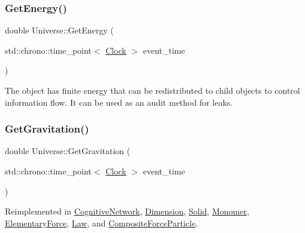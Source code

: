 \mbox{\label{classUniverse_a3b25e7ce6552991b7d5e6a9eb6e8a7ff}} 
\subsubsection{\texorpdfstring{Get\+Energy()}{GetEnergy()}}
{\footnotesize\ttfamily double Universe\+::\+Get\+Energy (\begin{DoxyParamCaption}\item[{std\+::chrono\+::time\+\_\+point$<$ \mbox{\hyperlink{universe_8h_a0ef8d951d1ca5ab3cfaf7ab4c7a6fd80}{Clock}} $>$}]{event\+\_\+time }\end{DoxyParamCaption})}

The object has finite energy that can be redistributed to child objects to control information flow. It can be used as an audit method for leaks.\mbox{\label{classUniverse_ab0404e774ee0ed66b597ff5b8e989446}} 
\subsubsection{\texorpdfstring{Get\+Gravitation()}{GetGravitation()}}
{\footnotesize\ttfamily double Universe\+::\+Get\+Gravitation (\begin{DoxyParamCaption}\item[{std\+::chrono\+::time\+\_\+point$<$ \mbox{\hyperlink{universe_8h_a0ef8d951d1ca5ab3cfaf7ab4c7a6fd80}{Clock}} $>$}]{event\+\_\+time }\end{DoxyParamCaption})\hspace{0.3cm}{\ttfamily [virtual]}}



Reimplemented in \mbox{\hyperlink{classCognitiveNetwork_a4b5150310288c52f00ecb745ae9e7f86}{Cognitive\+Network}}, \mbox{\hyperlink{classDimension_a652220a2eb1b26c749ad032865d81788}{Dimension}}, \mbox{\hyperlink{classSolid_ab5ecb5598be93fe3cd2a21c0cfd363c8}{Solid}}, \mbox{\hyperlink{classMonomer_aa5f7b901e15c9a9eb6e1c3564cd06e4f}{Monomer}}, \mbox{\hyperlink{classElementaryForce_a579afb8079668f0587096934d1de9c04}{Elementary\+Force}}, \mbox{\hyperlink{classLaw_a84bdc0c2ca97a9c19422018ff761b992}{Law}}, and \mbox{\hyperlink{classCompositeForceParticle_a06483dc73c156679f34acf85aa5f924e}{Composite\+Force\+Particle}}.

